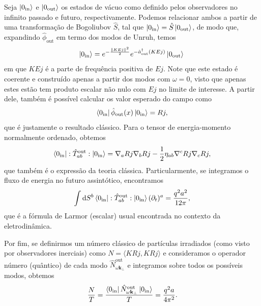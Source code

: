 \documentclass[10pt]{article}
\begin{document}
\begin{multicols*}{2}
    Seja \(\ket{0_\text{in}}\) e \(\ket{0_\text{out}}\) os estados de vácuo como definido pelos observadores no infinito passado e futuro, respectivamente. Podemos relacionar ambos a partir de uma transformação de Bogoliubov \(\hat{S}\), tal que \(\ket{0_\text{in}}=\hat{S}\ket{0_\text{out}}\), de modo que, expandindo \(\hat{\phi}_\text{out}\) em termo dos modos de Unruh, temos
    \begin{equation}
        \ket{0_\text{in}}=e^{-\frac{\lVert KEj\rVert^2}{2}}e^{-\hat{a}^\dagger_{\text{out}}(KEj)}\ket{0_\text{out}}\\
    \end{equation}
    em que \(KEj\) é a parte de frequência positiva de \(Ej\). Note que este estado é coerente e construído apenas a partir dos modos com \(\omega=0\), visto que apenas estes estão tem produto escalar não nulo com \(Ej\) no limite de interesse. A partir dele, também é possível calcular os valor esperado do campo como
    \begin{equation}
        \bra{0_\text{in}}\hat{\phi}_\text{out}(x)\ket{0_\text{in}}=Rj,
    \end{equation}
    que é justamente o resultado clássico. Para o tensor de energia-momento normalmente ordenado, obtemos
    \begin{equation}
        \bra{0_\text{in}}:\hat{T}^\text{out}_{ab}:\ket{0_\text{in}}=\nabla_aRj\nabla_bRj-\frac{1}{2}\eta_{ab}\nabla^cRj\nabla_cRj,
    \end{equation}
    que também é o expressão da teoria clássica. Particularmente, se integramos o fluxo de energia no futuro assintótico, encontramos
    \begin{equation}
        \int\mathrm{d}S^b\bra{0_\text{in}}:\hat{T}^\text{out}_{ab}:\ket{0_\text{in}}(\partial_t)^a=\frac{q^2a^2}{12\pi},
    \end{equation}
    que é a fórmula de Larmor (escalar) usual encontrada no contexto da eletrodinâmica.

    Por fim, se definirmos um número clássico de partículas irradiados (como visto por observadores inerciais) como \(N=\langle KRj,KRj\rangle\) e consideramos o operador número (quântico) de cada modo \(\hat{N}^{\text{out}}_{\omega\mathbf{k}_\perp}\) e integramos sobre todos os possíveis modos, obtemos
    \begin{equation}
        \frac{N}{T}=\frac{\bra{0_\text{in}}\hat{N}^{\text{out}}_{\omega\mathbf{k}_\perp}\ket{0_\text{in}}}{T}=\frac{q^2a}{4\pi^2}.
    \end{equation}


\end{multicols*}
\end{document}
